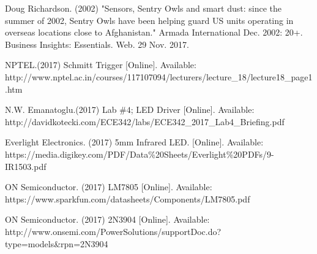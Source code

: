 \documentclass{article}
\begin{document}
    
    \newpage
\clearpage

\appendix

\begin{thebibliography}{00}




 Doug Richardson. (2002) "Sensors, Sentry Owls and smart dust: since the summer of 2002, Sentry Owls have been helping guard US units operating in overseas locations close to Afghanistan." Armada International Dec. 2002: 20+. Business Insights: Essentials. Web. 29 Nov. 2017.
\newline




 NPTEL.(2017) Schmitt Trigger [Online]. Available: http://www.nptel.ac.in/courses/117107094/lecturers/lecture\_18/lecture18\_page1.htm
\newline

  N.W. Emanatoglu.(2017) Lab $\#4$; LED Driver [Online].
Available: 
http://davidkotecki.com/ECE342/labs/ECE342\_2017\_Lab4\_Briefing.pdf
\newline

 Everlight Electronics. (2017) 5mm Infrared LED. [Online]. Available:
https://media.digikey.com/PDF/Data\%20Sheets/Everlight\%20PDFs/9-IR1503.pdf
\newline

 ON Semiconductor. (2017) LM7805 [Online]. Available: 
https://www.sparkfun.com/datasheets/Components/LM7805.pdf
\newline

 ON Semiconductor. (2017) 2N3904 [Online]. Available: http://www.onsemi.com/PowerSolutions/supportDoc.do?type=models\&rpn=2N3904
\newline


\end{thebibliography}
\end{document}
